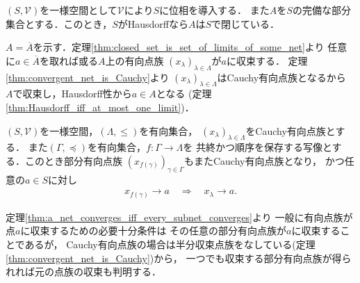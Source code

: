 	\begin{screen}
		\begin{thm}[Hausdorff一様位相空間の完備部分集合は閉]
			$(S,\mathscr{V})$を一様空間として$\mathscr{V}$により$S$に位相を導入する．
			また$A$を$S$の完備な部分集合とする．このとき，$S$がHausdorffなら$A$は$S$で閉じている．
		\end{thm}
	\end{screen}
	
	\begin{prf}
		$A = \overline{A}$を示す．定理\ref{thm:closed_set_is_set_of_limits_of_some_net}より
		任意に$a \in \overline{A}$を取れば或る$A$上の有向点族
		$(x_\lambda)_{\lambda \in \Lambda}$が$a$に収束する．
		定理\ref{thm:convergent_net_is_Cauchy}より
		$(x_\lambda)_{\lambda \in \Lambda}$はCauchy有向点族となるから
		$A$で収束し，Hausdorff性から$a \in A$となる
		(定理\ref{thm:Hausdorff_iff_at_most_one_limit})．
		\QED
	\end{prf}
	
	\begin{screen}
		\begin{thm}
		\label{thm:subnet_of_a_Cauchy_net_is_Cauchy}
			$(S,\mathscr{V})$を一様空間，$(\Lambda,\leq)$を有向集合，
			$(x_\lambda)_{\lambda \in \Lambda}$をCauchy有向点族とする．
			また$(\Gamma,\preceq)$を有向集合，$f:\Gamma \longrightarrow \Lambda$を
			共終かつ順序を保存する写像とする．このとき部分有向点族
			$(x_{f(\gamma)})_{\gamma \in \Gamma}$もまたCauchy有向点族となり，
			かつ任意の$a \in S$に対し
			\begin{align}
				x_{f(\gamma)} \longrightarrow a
				\quad \Longrightarrow \quad
				x_\lambda \longrightarrow a.
			\end{align}
		\end{thm}
	\end{screen}
	定理\ref{thm:a_net_converges_iff_every_subnet_converges}より
	一般に有向点族が点$a$に収束するための必要十分条件は
	その任意の部分有向点族が$a$に収束することであるが，
	Cauchy有向点族の場合は半分収束点族をなしている(定理\ref{thm:convergent_net_is_Cauchy})から，
	一つでも収束する部分有向点族が得られれば元の点族の収束も判明する．
	
